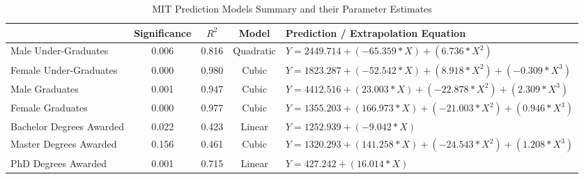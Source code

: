 \documentclass[runningheads,a4paper]{llncs}
\begin{document}
\mainmatter  %

\begin{sidewaystable}[h]
\caption{MIT Prediction Models Summary and their Parameter Estimates} 
\centering                           
\begin{tabular}{l c c c l}              
\hline\hline 
{} & Significance & $R^2$ & Model  & Prediction / Extrapolation Equation \\[1ex]
\hline                                      %
{Male Under-Graduates} & 0.006 & 0.816 &	Quadratic &	$Y = 2449.714 + (-65.359*X) + (6.736*X^2)$ \\[1ex]
Female Under-Graduates & 0.000 &	0.980 &	Cubic &	$Y = 1823.287 + (-52.542*X) + (8.918*X^2) + (-0.309*X^3)$ \\[1ex] 
Male Graduates & 0.001 &	0.947 &	Cubic &	$Y = 4412.516 + (23.003*X) + (-22.878*X^2) + (2.309*X^3)$ \\[1ex] 
Female Graduates & 0.000 &	0.977 &	Cubic &	$Y = 1355.203 + (166.973*X) + (-21.003*X^2) + (0.946*X^3)$ \\[1ex] 
Bachelor Degrees Awarded & 0.022 &	0.423 &	Linear & $Y = 1252.939 + (-9.042*X)$ \\[1ex] 
Master Degrees Awarded & 0.156 &	0.461 &	Cubic &	$Y = 1320.293 + (141.258*X) + (-24.543*X^2) + (1.208*X^3)$ \\[1ex] 
PhD Degrees Awarded & 0.001 &	0.715 &	Linear & $Y = 427.242 + (16.014*X)$ \\ 
\hline                          %
\end{tabular}
\label{table:table3}
\end{sidewaystable} 

\end{document}
